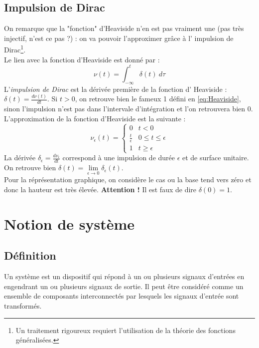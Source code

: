 \subsection{Impulsion de Dirac}
On remarque que la "fonction" d'Heaviside n'en est pas vraiment une (pas 
très injectif, n'est ce pas ?) : on va pouvoir l'approximer grâce à l'
impulsion de Dirac\footnote{Un traitement rigoureux requiert l'utilisation 
	de la théorie des fonctions généralisées.}.\\
Le lien avec la fonction d'Heaviside est donné par : 
\begin{equation}
	\nu(t) = \int_{-\infty}^t \delta(t)\ d\tau
\end{equation}
L'\textit{impulsion de Dirac} est la dérivée première de la fonction d'
Heaviside : $\delta(t) = \frac{d\nu(t)}{dt}$. Si $t>0$, on retrouve bien 
le fameux 1 défini en \autoref{eq:Heaviside}, sinon l'impulsion n'est pas 
dans l'intervale d'intégration et l'on retrouvera bien 0.\\
L'approximation de la fonction d'Heaviside est la suivante :
\begin{equation}
	\nu_\epsilon(t) = \left\{\begin{array}{ll}
	0 & t<0\\
	\frac{t}{\epsilon}	 & 0\leq t \leq \epsilon\\
	1 & t \geq \epsilon
	\end{array}\right.
\end{equation}
La dérivée $\delta_\epsilon = \frac{d\nu_\epsilon}{dt}$ correspond à une 
impulsion de durée $\epsilon$ et de surface unitaire. On retrouve bien 
$\delta(t) = \lim\limits_{\epsilon\rightarrow0} \delta_\epsilon(t)$.\\
Pour la réprésentation graphique, on considère le cas ou la base tend 
vers zéro et donc la hauteur est très élevée. \textbf{Attention !} Il 
est faux de dire $\delta(0)=1$.
	
	
\section{Notion de système}
\subsection{Définition}
Un système est un dispositif qui répond à un ou plusieurs signaux d’entrées 
en engendrant un ou plusieurs signaux de sortie. Il peut être considéré 
comme un ensemble de composants interconnectés par lesquels les signaux 
d’entrée sont transformés.
	

